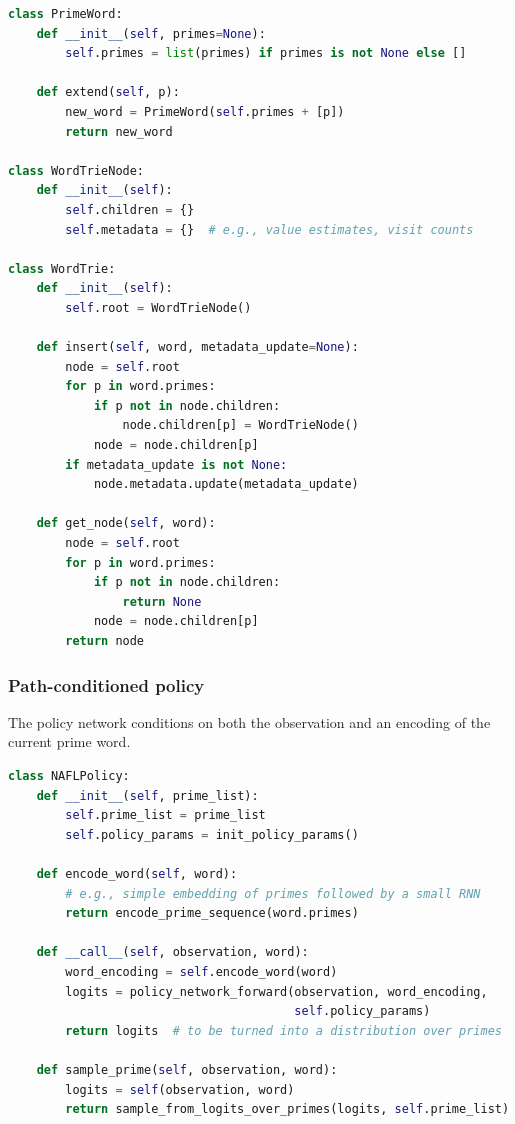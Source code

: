 \documentclass[11pt]{article}
\begin{document}
\begin{lstlisting}[language=Python, caption={Prime word and trie structures}]
class PrimeWord:
    def __init__(self, primes=None):
        self.primes = list(primes) if primes is not None else []

    def extend(self, p):
        new_word = PrimeWord(self.primes + [p])
        return new_word

class WordTrieNode:
    def __init__(self):
        self.children = {}
        self.metadata = {}  # e.g., value estimates, visit counts

class WordTrie:
    def __init__(self):
        self.root = WordTrieNode()

    def insert(self, word, metadata_update=None):
        node = self.root
        for p in word.primes:
            if p not in node.children:
                node.children[p] = WordTrieNode()
            node = node.children[p]
        if metadata_update is not None:
            node.metadata.update(metadata_update)

    def get_node(self, word):
        node = self.root
        for p in word.primes:
            if p not in node.children:
                return None
            node = node.children[p]
        return node
\end{lstlisting}

\subsubsection{Path-conditioned policy}

The policy network conditions on both the observation and an encoding of the current prime word.

\begin{lstlisting}[language=Python, caption={Path-conditioned policy skeleton}]
class NAFLPolicy:
    def __init__(self, prime_list):
        self.prime_list = prime_list
        self.policy_params = init_policy_params()

    def encode_word(self, word):
        # e.g., simple embedding of primes followed by a small RNN
        return encode_prime_sequence(word.primes)

    def __call__(self, observation, word):
        word_encoding = self.encode_word(word)
        logits = policy_network_forward(observation, word_encoding,
                                        self.policy_params)
        return logits  # to be turned into a distribution over primes

    def sample_prime(self, observation, word):
        logits = self(observation, word)
        return sample_from_logits_over_primes(logits, self.prime_list)
\end{lstlisting}
\end{document}
